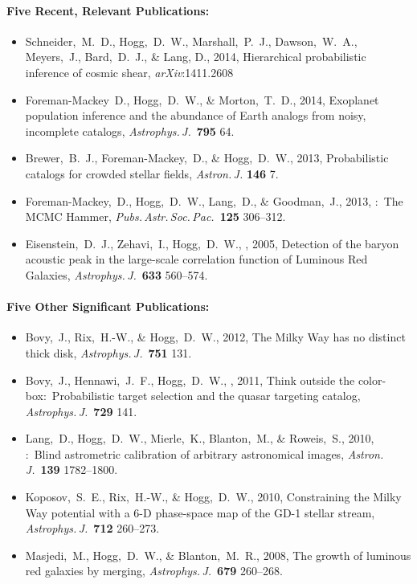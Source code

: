 \documentclass[letterpaper,12pt]{article}
\begin{document}
\paragraph{Five Recent, Relevant Publications:}
\begin{itemize}\setlength{\itemsep}{0pt}
\item
Schneider,~M.~D., Hogg,~D.~W., Marshall,~P.~J., Dawson,~W.~A., Meyers,~J., Bard,~D.~J., \& Lang, D., 2014,
{Hierarchical probabilistic inference of cosmic shear},
\textit{arXiv}:1411.2608
\item
Foreman-Mackey~D., Hogg,~D.~W., \& Morton,~T.~D., 2014,
{Exoplanet population inference and the abundance of Earth analogs from noisy, incomplete catalogs},
\textit{Astrophys.\,J.}\ \textbf{795} 64.
\item
Brewer,~B.~J., Foreman-Mackey,~D., \& Hogg,~D.~W., 2013,
{Probabilistic catalogs for crowded stellar fields},
\textit{Astron.\,J.} \textbf{146} 7.
\item
Foreman-Mackey,~D., Hogg,~D.~W., Lang,~D., \& Goodman,~J., 2013,
{:\ The MCMC Hammer},
\textit{Pubs.\,Astr.\,Soc.\,Pac.}\ \textbf{125} 306--312.
\item
Eisenstein,~D.~J., Zehavi,~I., Hogg,~D.~W., \etal, 2005,
{Detection of the baryon acoustic peak in the large-scale correlation function of  Luminous Red Galaxies},
\textit{Astrophys.\,J.}\ \textbf{633} 560--574.
\end{itemize}

\paragraph{Five Other Significant Publications:}
\begin{itemize}\setlength{\itemsep}{0pt}
\item
Bovy,~J., Rix,~H.-W., \& Hogg,~D.~W., 2012,
{The Milky Way has no distinct thick disk},
\textit{Astrophys.\,J.}\ \textbf{751} 131.
\item
Bovy,~J., Hennawi,~J.~F., Hogg,~D.~W., \etal, 2011,
{Think outside the color-box:\ Probabilistic target selection and the  quasar targeting catalog},
\textit{Astrophys.\,J.}\ \textbf{729} 141.
\item
Lang,~D., Hogg,~D.~W., Mierle,~K., Blanton,~M., \& Roweis,~S., 2010,
{:\ Blind astrometric calibration of arbitrary astronomical images},
\textit{Astron.\,J.}\ \textbf{139} 1782--1800.
\item
Koposov,~S.~E., Rix,~H.-W., \& Hogg,~D.~W., 2010,
{Constraining the Milky Way potential with a 6-D phase-space map of the GD-1 stellar stream},
\textit{Astrophys.\,J.}\ \textbf{712} 260--273.
\item
Masjedi,~M., Hogg,~D.~W., \& Blanton,~M.~R., 2008,
{The growth of luminous red galaxies by merging},
\textit{Astrophys.\,J.}\ \textbf{679} 260--268.
\end{itemize}
\end{document}
